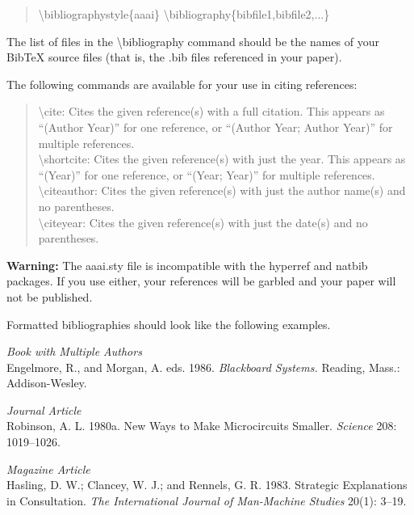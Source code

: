 \documentclass[letterpaper]{article}
\begin{document}
\begin{quote}
\begin{small}
\textbackslash bibliographystyle\{aaai\}
\textbackslash bibliography\{bibfile1,bibfile2,...\}
\end{small}
\end{quote}

The list of files in the \textbackslash  bibliography command should be the names of your BibTeX source files (that is, the .bib files referenced in your paper).

The following commands are available for your use in citing references:
\begin{quote}
\begin{small}
\textbackslash cite: Cites the given reference(s) with a full citation. This appears as ``(Author Year)'' for one reference, or ``(Author Year; Author Year)'' for multiple references.\\
\textbackslash shortcite: Cites the given reference(s) with just the year. This appears as ``(Year)'' for one reference, or ``(Year; Year)'' for multiple references.\\
\textbackslash citeauthor: Cites the given reference(s) with just the author name(s) and no parentheses.\\
\textbackslash citeyear: Cites the given reference(s) with just the date(s) and no parentheses.
\end{small}
\end{quote}

\textbf{Warning:} The aaai.sty file is incompatible with the hyperref and natbib packages. If you use either, your references will be garbled and your paper will not be published.

Formatted bibliographies should look like the following examples.

\smallskip \noindent \textit{Book with Multiple Authors}\\
Engelmore, R., and Morgan, A. eds. 1986. \textit{Blackboard Systems.} Reading, Mass.: Addison-Wesley.

\smallskip \noindent \textit{Journal Article}\\
Robinson, A. L. 1980a. New Ways to Make Microcircuits Smaller. \textit{Science} 208: 1019--1026.

\smallskip \noindent \textit{Magazine Article}\\
Hasling, D. W.; Clancey, W. J.; and Rennels, G. R. 1983. Strategic Explanations in Consultation. \textit{The International Journal of Man-Machine Studies} 20(1): 3--19.
\end{document}
